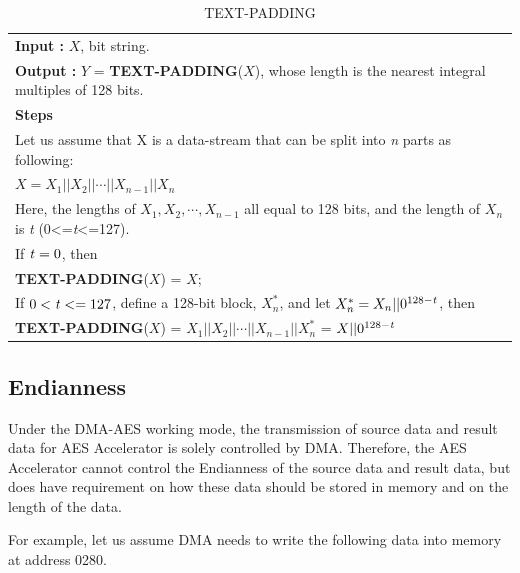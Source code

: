 \documentclass[main\_\_EN.tex]{subfiles}
\begin{document}
\begin{longtable}[c]{|p{15cm}|}
\caption{TEXT-PADDING}
\label{table:DefineFunctionTextPadding}\\
\hline
\rowcolor{lightgray}
\multirow{1}{*}{%
{\bfseries Function :} {\bfseries TEXT-PADDING}(\ ) } \\\hline
{\bfseries Input\phantom{aaa} :} $X$, bit string.\\
{\bfseries Output\phantom{a~} :} $Y$ = {\bfseries TEXT-PADDING}($X$), whose length is the nearest integral multiples of 128 bits. \\\hline
{\bfseries Steps\phantom{aa~}  }\\
\hspace{1.3cm} Let us assume that X is a data-stream that can be split into {\it{n}} parts as following: \\
\phantom{aaaaaaaa}$X = X_{1} || X_{2} || \cdots || X_{n-1} || X_{n}$ \\
\phantom{aaaaaaaa}Here, the lengths of $X_{1}, X_{2}, \cdots, X_{n-1}$ all equal to 128 bits, and the length of $X_{n}$ is {\it{t}} (0<={\it{t}}<=127).\\
\phantom{aaaaaaaa}If ${\it{t}} = 0$, then\\
\phantom{aaaaaaaa}\phantom{空空空空空} {\bfseries TEXT-PADDING}($X$) = $X$;\\
\phantom{aaaaaaaa}If $0<{\it{t}} <= 127$, define a 128-bit block, $X_{n}^{*}$, and let $X_{n}^{*} = X_{n} || 0^{128-{\it{t}}}$, then\\
\phantom{aaaaaaaa}\phantom{空空空空空} {\bfseries TEXT-PADDING}($X$) = $X_{1} || X_{2} || \cdots || X_{n-1} || X_{n}^{*}$  = $X || 0^{128-{\it{t}}}$\\
\hline
\end{longtable}



\subsection{Endianness}

Under the DMA-AES working mode, the transmission of source data and result data for AES Accelerator is solely controlled by DMA. Therefore, the AES Accelerator cannot control the Endianness of the source data and result data, but does have requirement on how these data should be stored in memory and on the length of the data.

For example, let us assume DMA needs to write the following data into memory at address \hexprefix{}0280.
\end{document}
